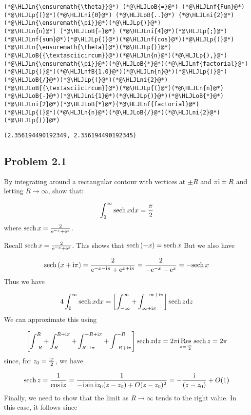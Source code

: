\documentclass[12pt,a4paper]{article}
\newcommand{\HLJLn}[1]{#1}
\newcommand{\HLJLnf}[1]{\textcolor[RGB]{66,102,213}{#1}}
\newcommand{\HLJLnfB}[1]{\textcolor[RGB]{59,151,46}{#1}}
\newcommand{\HLJLni}[1]{\textcolor[RGB]{59,151,46}{#1}}
\newcommand{\HLJLoB}[1]{\textcolor[RGB]{102,102,102}{\textbf{#1}}}
\newcommand{\HLJLp}[1]{#1}
\def\D{ {\rm d} }
\def\I{ {\rm i} }
\def\E{ {\rm e} }
\def\Res_#1{\underset{#1}{\rm Res}\,}
\def\sech{ {\rm sech}\, }
\def\dx{\D x}
\def\dz{\D z}
\begin{document}
\begin{lstlisting}
(*@\HLJLn{\ensuremath{\theta}}@*) (*@\HLJLoB{=}@*) (*@\HLJLnf{Fun}@*)(*@\HLJLp{(}@*)(*@\HLJLni{0}@*) (*@\HLJLoB{..}@*) (*@\HLJLni{2}@*)(*@\HLJLn{\ensuremath{\pi}}@*)(*@\HLJLp{)}@*)
(*@\HLJLn{n}@*) (*@\HLJLoB{=}@*) (*@\HLJLni{4}@*)(*@\HLJLp{;}@*)
(*@\HLJLnf{sum}@*)(*@\HLJLp{(}@*)(*@\HLJLnf{cos}@*)(*@\HLJLp{(}@*)(*@\HLJLn{\ensuremath{\theta}}@*)(*@\HLJLp{)}@*)(*@\HLJLoB{{\textasciicircum}}@*)(*@\HLJLn{n}@*)(*@\HLJLp{),}@*) (*@\HLJLn{\ensuremath{\pi}}@*)(*@\HLJLoB{*}@*)(*@\HLJLnf{factorial}@*)(*@\HLJLp{(}@*)(*@\HLJLnfB{1.0}@*)(*@\HLJLn{n}@*)(*@\HLJLp{)}@*)(*@\HLJLoB{/}@*)(*@\HLJLp{(}@*)(*@\HLJLni{2}@*)(*@\HLJLoB{{\textasciicircum}}@*)(*@\HLJLp{(}@*)(*@\HLJLn{n}@*)(*@\HLJLoB{-}@*)(*@\HLJLni{1}@*)(*@\HLJLp{)}@*)(*@\HLJLoB{*}@*)(*@\HLJLni{2}@*)(*@\HLJLoB{*}@*)(*@\HLJLnf{factorial}@*)(*@\HLJLp{(}@*)(*@\HLJLn{n}@*)(*@\HLJLoB{/}@*)(*@\HLJLni{2}@*)(*@\HLJLp{))}@*)
\end{lstlisting}

\begin{lstlisting}
(2.356194490192349, 2.356194490192345)
\end{lstlisting}


\subsection{Problem 2.1}
By integrating around a rectangular contour with vertices at $\pm R$ and $\pi \I \pm R$ and letting $R \rightarrow \infty$, show that:

\[
\int_0^\infty \sech x \dx = {\pi \over 2}
\]
where $\sech x = {2 \over \E^{-x} + \E^x}$.

Recall $\sech x = {2 \over \E^{-x} + \E^x} $. This shows that $\sech(-x) = \sech x$ But we also have

\[
\sech(x + \I \pi) =  {2 \over \E^{-x-\I \pi} + \E^{x+ \I \pi}} =  {2 \over -\E^{-x} - \E^{x}} = -\sech x
\]
Thus we have

\[
    4\int_0^\infty \sech x \dx = \left[ \int_{-\infty}^\infty + \int_{\infty+\I\pi}^{-\infty + \I \pi} \right] \sech z \dz
\]
We can approximate this using

\[
\left[ \int_{-R}^R + \int_R^{R+\I \pi} + \int_{R+\I \pi}^{-R+\I\pi} + \int_{-R+\I \pi}^{-R} \right ] \sech z \dz = 2 \pi \I \Res_{z = {\I \pi \over 2}} \sech z  = 2 \pi
\]
since, for $z_0 = {\I \pi \over 2}$, we have

\[
\sech z = {1 \over \cos \I z} = {1 \over - \I \sin \I z_0 (z- z_0) + O(z-z_0)^2}
= -{\I \over (z- z_0)} + O(1)
\]
Finally, we need to show that the limit as $R \rightarrow \infty$ tends to the right value. In this case, it follows since
\end{document}
